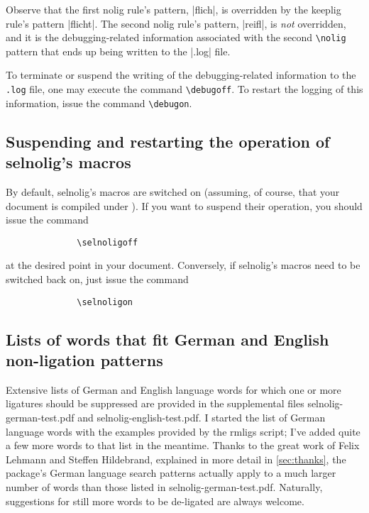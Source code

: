 \documentclass[11pt]{article}
\newcommand{\pkg}[1]{\textsf{#1}}
\newcommand{\opt}[1]{\texttt{#1}}
\newcommand{\cmmd}[1]{\texttt{\textbackslash #1}}
\begin{document}
Observe that the first nolig rule's pattern, |flich|, is overridden by the keeplig rule's pattern |flicht|. The second nolig rule's pattern, |reifl|, is \emph{not} overridden, and it is the debugging-related information associated with the second \cmmd{nolig} pattern that ends up being written to the |.log| file. 

To terminate or suspend the writing of the debugging-related information to the \opt{.log} file, one may execute the command \cmmd{debugoff}. To restart the logging of this information, issue the command \cmmd{debugon}.



\subsection[Suspending and restarting the operation of selnolig's macros]{Suspending and restarting the operation of \pkg{selnolig}'s macros}

By default, \pkg{selnolig}'s macros are switched on (assuming, of course, that your document is compiled under \LuaLaTeX). If you want to suspend their operation, you should issue the command
\begin{Verbatim}
              \selnoligoff
\end{Verbatim}
at the desired point in your document. Conversely, if \pkg{selnolig}'s macros need to be switched back on, just issue the command
\begin{Verbatim}
              \selnoligon
\end{Verbatim}


\subsection{Lists of words that fit German and English non-ligation patterns}

Extensive lists of German and English language words for which one or more ligatures should be suppressed are provided in the supplemental files \pkg{selnolig-german-test.pdf} and \pkg{selnolig-english-test.pdf}. I started the list of German language words with the examples provided by the \pkg{rmligs} script; I've added quite a few more words to that list in the meantime. Thanks to the great work of Felix Lehmann and Steffen Hildebrand, explained in more detail in \cref{sec:thanks}, the package's German language search patterns actually apply to a much larger number of words than those listed in \pkg{selnolig-german-test.pdf}. Naturally, suggestions for still more words to be de-ligated are always welcome.
\end{document}
